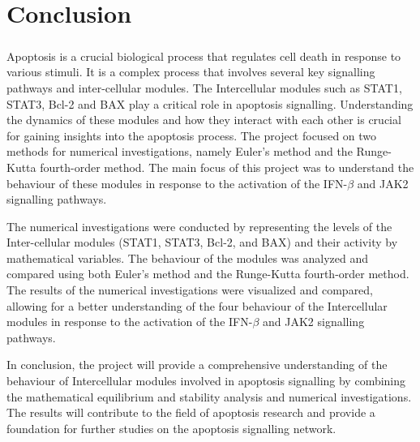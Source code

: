 \chapter{Conclusion}
\label{chap:06}

\paragraph{}

Apoptosis is a crucial biological process that regulates cell death in response to various stimuli. It is a complex process that involves several key signalling pathways and inter-cellular modules. The Intercellular modules such as STAT1, STAT3, Bcl-2 and BAX play a critical role in apoptosis signalling. Understanding the dynamics of these modules and how they interact with each other is crucial for gaining insights into the apoptosis process. The project focused on two methods for numerical investigations, namely Euler’s method and the Runge-Kutta fourth-order method. The main focus of this project was to understand the behaviour of these modules in response to the activation of the IFN-$\beta$ and JAK2 signalling pathways. 

The numerical investigations were conducted by representing the levels of the Inter-cellular modules (STAT1, STAT3, Bcl-2, and BAX) and their activity by mathematical variables. The behaviour of the modules was analyzed and compared using both Euler’s method and the Runge-Kutta fourth-order method. The results of the numerical investigations were visualized and compared, allowing for a better understanding of the four behaviour of the Intercellular modules in response to the activation of the IFN-$\beta$ and JAK2
signalling pathways. 

In conclusion, the project will provide a comprehensive understanding of the behaviour of Intercellular modules involved in apoptosis signalling by combining the mathematical equilibrium and stability analysis and numerical investigations. The results will contribute to the field of apoptosis research and provide a foundation for further studies on the apoptosis signalling network.